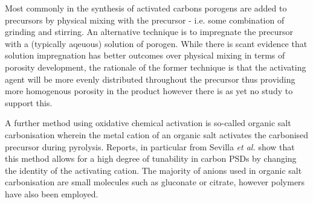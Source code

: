 Most commonly in the synthesis of activated carbons \glspl{porogen} are added to precursors by physical mixing with the precursor - i.e. some combination of grinding and stirring.\citep{Aljumialy2020Porous, Blankenship2017Cigarette, Altwala2020Predictable, Sevilla2016Highly} An alternative technique is to impregnate the precursor with a (typically aqeuous) solution of \gls{porogen}.\citep{Botome2017Preparation, Ge2019Highly, Adlak2021Physicochemical, Shi2021Copper, Han2021Mulch} While there is scant evidence that solution impregnation has better outcomes over physical mixing in terms of porosity development, the rationale of the former technique is that the \gls{activating agent} will be more evenly distributed throughout the precursor thus providing more homogenous porosity in the product however there is as yet no study to support this. 

A further method using oxidative chemical activation is so-called organic salt carbonisation wherein the metal cation of an organic salt activates the carbonised precursor during pyrolysis. Reports, in particular from Sevilla \textit{et al.} show that this method allows for a high degree of tunability in carbon PSDs by changing the identity of the activating cation.\citep{Sevilla2013general, Tsumura2014Structure, Ferrero2015Mesoporous, Ferrero2016Efficient, Fuertes2015Hierarchical, Roberts2015Hierarchically, Yadav20123D, Yang2018Spontaneous} The majority of anions used in organic salt carbonisation are small molecules such as gluconate or citrate,\citep{Sevilla2013general, Yang2017Template, Sevilla2014Direct, Tsumura2014Structure, Ferrero2015Mesoporous, Ferrero2016Efficient, Fuertes2015Hierarchical, Yang2020Production, Fuertes2014One} however polymers have also been employed.\citep{Puthusseri20143D, Roberts2015Hierarchically, Yadav20123D, Hines2004Surface} 

